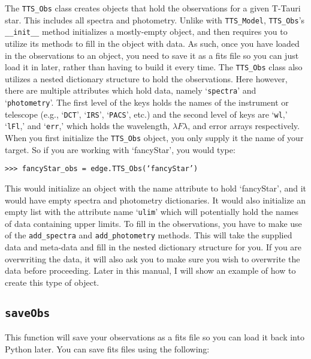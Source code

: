 \documentclass{article}
\begin{document}
\noindent The \texttt{TTS\_Obs} class creates objects that hold the observations for a given T-Tauri star. This includes all spectra and photometry. Unlike with \texttt{TTS\_Model}, \texttt{TTS\_Obs}’s \texttt{\_\_init\_\_} method initializes a mostly-empty object, and then requires you to utilize its methods to fill in the object with data. As such, once you have loaded in the observations to an object, you need to save it as a fits file so you can just load it in later, rather than having to build it every time. 
\vspace{2mm}
\noindent The \texttt{TTS\_Obs} class also utilizes a nested dictionary structure to hold the observations. Here however, there are multiple attributes which hold data, namely `\texttt{spectra}' and `\texttt{photometry}'. The first level of the keys holds the names of the instrument or telescope (e.g., ‘\texttt{DCT}’, ‘\texttt{IRS}’, ‘\texttt{PACS}’, etc.) and the second level of keys are ‘\texttt{wl},’ ‘\texttt{lFl},’ and ‘\texttt{err},’ which holds the wavelength, $\lambda F\lambda$, and error arrays respectively.  
When you first initialize the \texttt{TTS\_Obs} object, you only supply it the name of your target. So if you are working with `fancyStar', you would type: 

\vspace{2mm}
\texttt{>>> fancyStar\_obs = edge.TTS\_Obs(‘fancyStar’)}
\vspace{2mm}

\noindent This would initialize an object with the name attribute to hold `fancyStar', and it would have empty spectra and photometry dictionaries. It would also initialize an empty list with the attribute name ‘\texttt{ulim}’ which will potentially hold the names of data containing upper limits. 
To fill in the observations, you have to make use of the \texttt{add\_spectra} and \texttt{add\_photometry} methods. This will take the supplied data and meta-data and fill in the nested dictionary structure for you. If you are overwriting the data, it will also ask you to make sure you wish to overwrite the data before proceeding. Later in this manual, I will show an example of how to create this type of object. 
 
\subsection{\texttt{saveObs}}

\noindent This function will save your observations as a fits file so you can load it back into Python later. You can save fits files using the following:
\end{document}
